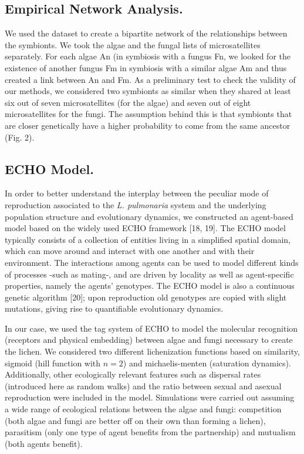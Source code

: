 
\subsection{Empirical Network Analysis.}

We  used the \cite{dalgrande2012verticalandhorizontalphotobionttransmissionwithinpopulationsofalichensymbiosis} dataset to create a bipartite network of the relationships between the symbionts. We took the algae and the fungal lists of microsatellites separately. For each algae An (in symbiosis with a fungus Fn, we looked for the existence of another fungus Fm in symbiosis with a similar algae Am and thus created a link between An and Fm. As a preliminary test to check the validity of our methods, we considered two symbionts as similar when they shared at least six out of seven microsatellites (for the algae) and seven out of eight microsatellites for the fungi. The assumption behind this is that symbionts that are closer genetically have a higher probability to come from the same ancestor (Fig. 2). 


\subsection{ECHO Model.}

In order to better understand the interplay between the peculiar mode of reproduction associated to the {\em L. pulmonaria} system and the underlying population structure and evolutionary dynamics, we constructed an agent-based model based on the widely used ECHO framework [18, 19]. The ECHO model typically consists of a collection of entities living in a simplified spatial domain, which can move around and interact with one another and with their environment. The interactions among agents can be used to model different kinds of processes -such as mating-, and are driven by locality as well as agent-specific properties, namely the agents' genotypes. The ECHO model is also a continuous genetic algorithm  [20]; upon reproduction old genotypes are copied with slight mutations, giving rise to quantifiable evolutionary dynamics.

In our case, we used the tag system of ECHO to model the molecular recognition (receptors and physical embedding) between algae and fungi necessary to create the lichen. We considered two different lichenization functions based on similarity, sigmoid (hill function with $n=2$) and michaelis-menten (saturation dynamics). Additionally, other ecologically relevant features such as dispersal rates (introduced here as random walks) and the ratio between sexual and asexual reproduction were included in the model. Simulations were carried out assuming a wide range of ecological relations between the algae and fungi: competition (both algae and fungi are better off on their own than forming a lichen), parasitism (only one type of agent benefits from the partnership) and mutualism (both agents benefit).

